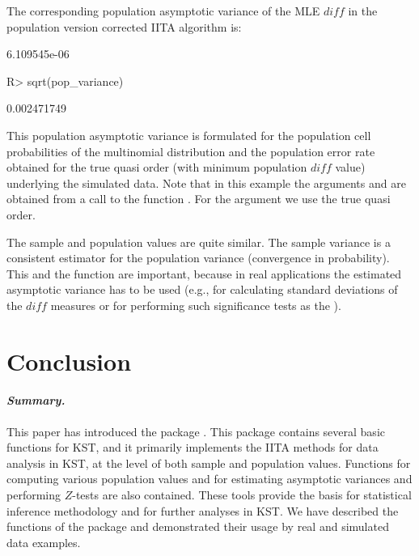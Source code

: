 \documentclass[nojss]{jss}
\begin{document}
The corresponding population asymptotic variance of the MLE $\mathit{diff}$ in the population
version corrected IITA algorithm is:
\begin{Schunk}
\begin{Soutput}
[1] 6.109545e-06
\end{Soutput}
\begin{Sinput}
R> sqrt(pop_variance)
\end{Sinput}
\begin{Soutput}
[1] 0.002471749
\end{Soutput}
\end{Schunk}
This population asymptotic variance is formulated for the population cell probabilities 
\linebreak
{} of the multinomial distribution and the population error rate obtained 
for the true quasi order (with minimum population $$ value) underlying the 
simulated data. Note that in this example the arguments  and  
are obtained from a call to the function . For the argument 
we use the true quasi order.

The sample and population values are quite similar. The sample variance is a consistent 
estimator for the population variance (convergence in probability). This and the function  are important, because in real applications the estimated asymptotic variance 
has to be used (e.g., for calculating standard deviations of the $$ measures 
or for performing such significance tests as the ).

\section{Conclusion}
\label{Conc}

\paragraph{\it Summary.}
This paper has introduced the  package . This package contains several basic functions for KST, and it primarily implements the IITA methods for data analysis in KST, at the level
of both sample and population values. Functions for computing various population values and for estimating asymptotic variances and performing $Z$-tests are also contained. 
These tools provide the basis for statistical inference methodology and for further analyses in KST. We have described the functions of the package  and demonstrated their usage by real and simulated data examples.
\end{document}
